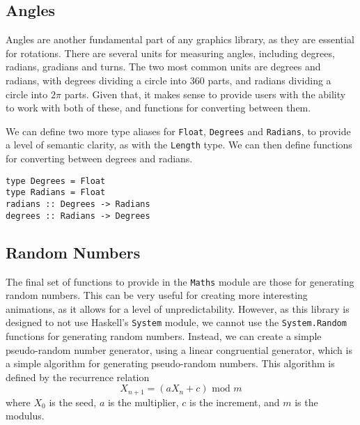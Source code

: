 \documentclass[../main.tex]{subfiles}
\begin{document}
        \subsection{Angles}
            Angles are another fundamental part of any graphics library, as they are
                essential for rotations.
            There are several units for measuring angles, including degrees, radians,
                gradians and turns.
            The two most common units are degrees and radians, with degrees dividing a
                circle into 360 parts, and radians dividing a circle into $2\pi$ parts.
            Given that, it makes sense to provide users with the ability to work with both
                of these, and functions for converting between them.

            We can define two more type aliases for \verb|Float|, \verb|Degrees| and
                \verb|Radians|, to provide a level of semantic clarity, as with the
                \verb|Length| type.
            We can then define functions for converting between degrees and radians.

            \begin{lstlisting}[label={lst:angleFns}, caption={The angle functions.}]  
type Degrees = Float
type Radians = Float                
radians :: Degrees -> Radians
degrees :: Radians -> Degrees\end{lstlisting}

        \subsection{Random Numbers}
            The final set of functions to provide in the \verb|Maths| module are those for
                generating random numbers.
            This can be very useful for creating more interesting animations, as it allows
                for a level of unpredictability.
            However, as this library is designed to not use Haskell's \verb|System| module,
                we cannot use the \verb|System.Random| functions for generating random numbers.
            Instead, we can create a simple pseudo-random number generator, using a linear
                congruential generator, which is a simple algorithm for generating
                pseudo-random numbers.
            This algorithm is defined by the recurrence relation $$X_{n+1} = (aX_n + c)
                    \text{ mod } m$$ where $X_0$ is the seed, $a$ is the multiplier, $c$ is the
                increment, and $m$ is the modulus.
\end{document}
